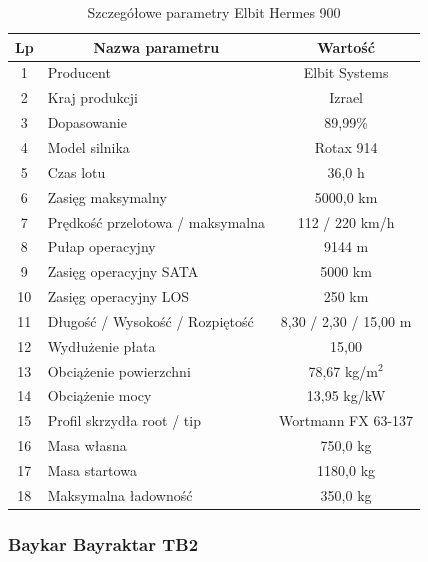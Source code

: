             \begin{longtable}{| c | m{0,5\linewidth} | c |}
                \caption{Szczegółowe parametry Elbit Hermes 900}
                \label{table:hermes_900_specs} \\
                \hline
                \textbf{Lp} & \multicolumn{1}{c|}{\textbf{Nazwa parametru}} & \textbf{Wartość} \\ \hline \hline
                \endfirsthead
                
                \hline
                \endfoot
                
                1 & Producent & Elbit Systems \\ \hline
                2 & Kraj produkcji & Izrael \\ \hline
                3 & Dopasowanie & 89,99\% \\ \hline
                4 & Model silnika & Rotax 914 \\ \hline
                5 & Czas lotu & 36,0 h \\ \hline
                6 & Zasięg maksymalny & 5000,0 km \\ \hline
                7 & Prędkość przelotowa / maksymalna & 112 / 220 km/h \\ \hline
                8 & Pułap operacyjny & 9144 m \\ \hline
                9 & Zasięg operacyjny SATA & 5000 km \\ \hline
                10 & Zasięg operacyjny LOS & 250 km \\ \hline
                11 & Długość / Wysokość / Rozpiętość & 8,30 / 2,30 / 15,00 m \\ \hline
                12 & Wydłużenie płata & 15,00 \\ \hline
                13 & Obciążenie powierzchni & 78,67 kg/m$^2$ \\ \hline
                14 & Obciążenie mocy & 13,95 kg/kW \\ \hline
                15 & Profil skrzydła root / tip & Wortmann FX 63-137 \\ \hline
                16 & Masa własna & 750,0 kg \\ \hline
                17 & Masa startowa & 1180,0 kg \\ \hline
                18 & Maksymalna ładowność & 350,0 kg \\ \hline
            \end{longtable}

            \clearpage
            \subsubsection{Baykar Bayraktar TB2}

